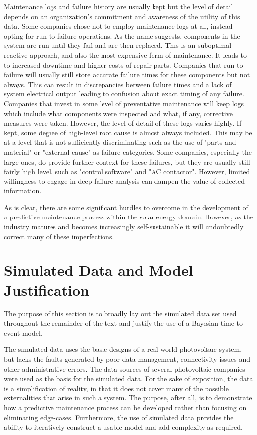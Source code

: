 Maintenance logs and failure history are usually kept but the level of detail depends on an organization's commitment and awareness of the utility of this data. Some companies chose not to employ maintenance logs at all, instead opting for run-to-failure operations. As the name suggests, components in the system are run until they fail and are then replaced. This is an suboptimal reactive approach, and also the most expensive form of maintenance. It leads to to increased downtime and higher costs of repair parts\cite{Mobley2002}. Companies that run-to-failure will usually still store accurate failure times for these components but not always. This can result in discrepancies between failure times and a lack of system electrical output leading to confusion about exact timing of any failure\cite{Laukamp2002}. Companies that invest in some level of preventative maintenance will keep logs which include what components were inspected and what, if any, corrective measures were taken. However, the level of detail of these logs varies highly. If kept, some degree of high-level root cause is almost always included. This may be at a level that is not sufficiently discriminating such as the use of "parts and material" or "external cause" as failure categories. Some companies, especially the large ones, do provide further context for these failures, but they are usually still fairly high level, such as "control software" and "AC contactor". However, limited willingness to engage in deep-failure analysis can dampen the value of collected information\cite{Golnas2013}.

As is clear, there are some significant hurdles to overcome in the development of a predictive maintenance process within the solar energy domain. However, as the industry matures and becomes increasingly self-sustainable it will undoubtedly correct many of these imperfections. 

\section*{Simulated Data and Model Justification}


The purpose of this section is to broadly lay out the simulated data set used throughout the remainder of the text and justify the use of a Bayesian time-to-event model. 

The simulated data uses the basic designs of a real-world photovoltaic system, but lacks the faults generated by poor data management, connectivity issues and other administrative errors. The data sources of several photovoltaic companies were used as the basis for the simulated data. For the sake of exposition, the data is a simplification of reality, in that it does not cover many of the possible externalities that arise in such a system. The purpose, after all, is to demonstrate how a predictive maintenance process can be developed rather than focusing on eliminating edge-cases. Furthermore, the use of simulated data provides the ability to iteratively construct a usable model and add complexity as required. 

